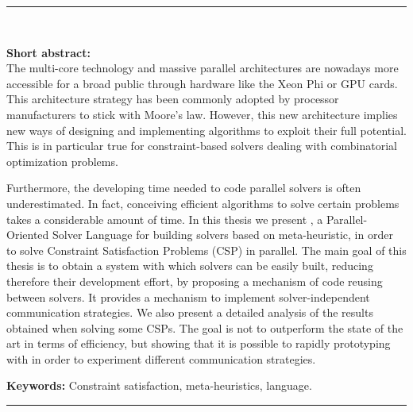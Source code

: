 \cleardoublepage
\begin{vcentrepage}
\noindent\rule[2pt]{\textwidth}{0.8pt}\\
\begin{center}
{\Large\textbf{\titre}}
\end{center}
{\large\textbf{Short abstract:}\\}
The multi-core technology and massive parallel architectures are nowadays more accessible for a broad public through hardware like the Xeon Phi or GPU cards. This architecture strategy has been commonly adopted by processor manufacturers to stick with Moore's law. However, this new architecture implies new ways of designing and implementing algorithms to exploit their full potential. This is in particular true for constraint-based solvers dealing with combinatorial optimization problems.

Furthermore, the developing time needed to code parallel solvers is often underestimated. In fact, conceiving efficient algorithms to solve certain problems takes a considerable amount of time. In this thesis we present \posl{}, a Parallel-Oriented Solver Language for building solvers based on meta-heuristic, in order to solve Constraint Satisfaction Problems (CSP) in parallel. The main goal of this thesis is to obtain a system with which solvers can be easily built, reducing therefore their development effort, by proposing a mechanism of code reusing between solvers. It provides a mechanism to implement solver-independent communication strategies. We also present a detailed analysis of the results obtained when solving some CSPs. The goal is not to outperform the state of the art in terms of efficiency, but showing that it is possible to rapidly prototyping with \posl{} in order to experiment different communication strategies.

{\large\textbf{Keywords:}}
Constraint satisfaction, meta-heuristics, language.

\noindent\rule[2pt]{\textwidth}{0.8pt}
\end{vcentrepage}
